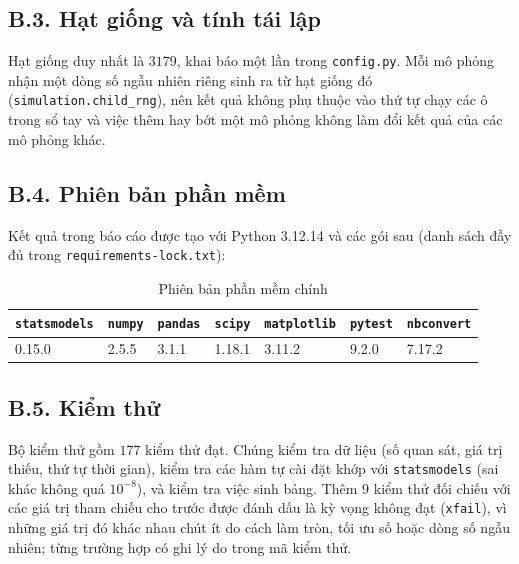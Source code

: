 \subsection*{B.3. Hạt giống và tính tái lập}

Hạt giống duy nhất là $3179$, khai báo một lần trong \texttt{config.py}. Mỗi mô phỏng nhận một dòng số ngẫu nhiên riêng sinh ra từ hạt giống đó (\texttt{simulation.child\_rng}), nên kết quả không phụ thuộc vào thứ tự chạy các ô trong sổ tay và việc thêm hay bớt một mô phỏng không làm đổi kết quả của các mô phỏng khác.

\subsection*{B.4. Phiên bản phần mềm}

Kết quả trong báo cáo được tạo với Python 3.12.14 và các gói sau (danh sách đầy đủ trong \texttt{requirements-lock.txt}):

\begin{table}[H]
\centering\small
\caption{Phiên bản phần mềm chính}\label{tab:phienban}
\renewcommand{\arraystretch}{1.2}
\begin{tabular}{@{}lllllll@{}}
\toprule
\texttt{statsmodels} & \texttt{numpy} & \texttt{pandas} & \texttt{scipy} & \texttt{matplotlib} & \texttt{pytest} & \texttt{nbconvert} \\
\midrule
0.15.0 & 2.5.5 & 3.1.1 & 1.18.1 & 3.11.2 & 9.2.0 & 7.17.2 \\
\bottomrule
\end{tabular}
\end{table}

\subsection*{B.5. Kiểm thử}

Bộ kiểm thử gồm $177$ kiểm thử đạt. Chúng kiểm tra dữ liệu (số quan sát, giá trị thiếu, thứ tự thời gian), kiểm tra các hàm tự cài đặt khớp với \texttt{statsmodels} (sai khác không quá $10^{-8}$), và kiểm tra việc sinh bảng. Thêm $9$ kiểm thử đối chiếu với các giá trị tham chiếu cho trước được đánh dấu là kỳ vọng không đạt (\texttt{xfail}), vì những giá trị đó khác nhau chút ít do cách làm tròn, tối ưu số hoặc dòng số ngẫu nhiên; từng trường hợp có ghi lý do trong mã kiểm thử.
